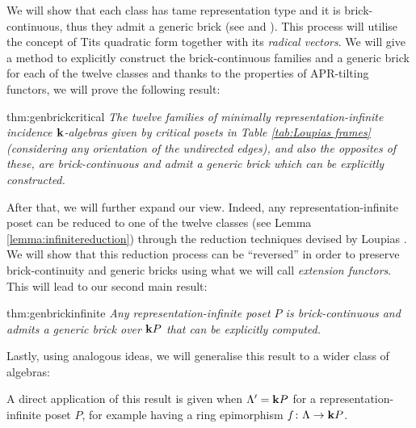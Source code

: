 We will show that each class has tame representation type and it is brick-continuous, thus they admit a generic brick (see \cite[Corollary 1.3]{bau:gen} and \cite[Theorem 5.6]{schlegel2026infinitetautiltingtheory}). This process will utilise the concept of Tits quadratic form together with its \emph{radical vectors}. We will give a method to explicitly construct the brick-continuous families and a generic brick for each of the twelve classes and thanks to the properties of APR-tilting functors, we will prove the following result:

\begin{reptheorem}{thm:genbrickcritical}
	\emph{The twelve families of minimally representation-infinite incidence $\mathbf{k}$-algebras given by critical posets in Table \ref{tab:Loupias frames} (considering any orientation of the undirected edges), and also the opposites of these, are brick-continuous and admit a generic brick which can be explicitly constructed.}
\end{reptheorem}

After that, we will further expand our view. Indeed, any representation-infinite poset can be reduced to one of the twelve classes (see Lemma \ref{lemma:infinitereduction}) through the reduction techniques devised by Loupias \cite{lou:ind,lou:repr}. We will show that this reduction process can be ``reversed'' in order to preserve brick-continuity and generic bricks using what we will call \emph{extension functors}. This will lead to our second main result:

\begin{reptheorem}{thm:genbrickinfinite}
	\emph{Any representation-infinite poset $P$ is brick-continuous and admits a generic brick over $\mathbf{k}{P}$ that can be explicitly computed.}
\end{reptheorem}

Lastly, using analogous ideas, we will generalise this result to a wider class of algebras:


A direct application of this result is given when $\Lambda'=\mathbf{k}{P}$ for a representation-infinite poset $P$, for example having a ring epimorphism $f\colon \Lambda \to \mathbf{k}{P}$.
